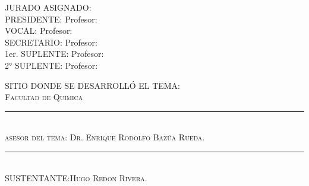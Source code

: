 \begin{minipage}[c][\textheight][s]{5.125in}
JURADO ASIGNADO:\\[0.5cm]

PRESIDENTE:		Profesor:\\
VOCAL: 		Profesor:\\
SECRETARIO:		Profesor:\\
1er.  SUPLENTE: 	Profesor:\\
2° SUPLENTE:		Profesor:\\[0.5cm]

\begin{center}
	SITIO DONDE SE DESARROLLÓ EL TEMA:\\
	\textsc{Facultad de Química}\\[3cm]


	\rule{6cm}{1pt}\\
	\textsc{asesor del tema: Dr. Enrique Rodolfo Bazúa Rueda.} \\[3cm]


	\rule{6cm}{1pt}\\
	\textsc{SUSTENTANTE:Hugo Redon Rivera.} 
\end{center}
\end{minipage}

